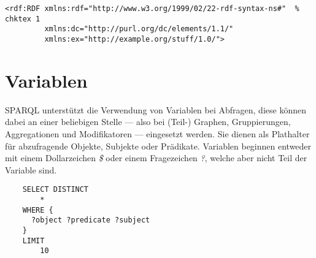 \begin{lstlisting}
<rdf:RDF xmlns:rdf="http://www.w3.org/1999/02/22-rdf-syntax-ns#"  % chktex 1
         xmlns:dc="http://purl.org/dc/elements/1.1/"
         xmlns:ex="http://example.org/stuff/1.0/">
\end{lstlisting}

\section{Variablen}
\label{sec:sparql_variablen}

SPARQL unterstützt die Verwendung von Variablen bei Abfragen, diese können dabei an einer beliebigen Stelle --- also bei (Teil-) Graphen, Gruppierungen, Aggregationen und Modifikatoren --- eingesetzt werden.
Sie dienen als Plathalter für abzufragende Objekte, Subjekte oder Prädikate. Variablen beginnen entweder mit einem Dollarzeichen \textit{\$} oder einem Fragezeichen \textit{?}, welche aber nicht Teil der Variable sind.

\begin{lstlisting}
    SELECT DISTINCT
        *
    WHERE {
      ?object ?predicate ?subject
    }
    LIMIT
        10
\end{lstlisting}

